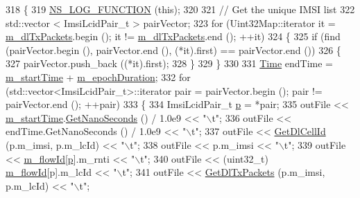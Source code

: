 \begin{DoxyCode}
318 \{
319   \hyperlink{log-macros-disabled_8h_a90b90d5bad1f39cb1b64923ea94c0761}{NS\_LOG\_FUNCTION} (\textcolor{keyword}{this});
320 
321   \textcolor{comment}{// Get the unique IMSI list}
322   std::vector < ImsiLcidPair\_t > pairVector;
323   \textcolor{keywordflow}{for} (Uint32Map::iterator it = \hyperlink{classns3_1_1RadioBearerStatsCalculator_aea685741eb32f0f501496176deb32ccb}{m\_dlTxPackets}.begin (); it != 
      \hyperlink{classns3_1_1RadioBearerStatsCalculator_aea685741eb32f0f501496176deb32ccb}{m\_dlTxPackets}.end (); ++it)
324     \{
325       \textcolor{keywordflow}{if} (find (pairVector.begin (), pairVector.end (), (*it).first) == pairVector.end ())
326         \{
327           pairVector.push\_back ((*it).first);
328         \}
329     \}
330 
331   \hyperlink{namespacens3_1_1TracedValueCallback_a7ffd3e7c142ffe7c8a1d2db9b8de38ec}{Time} endTime = \hyperlink{classns3_1_1RadioBearerStatsCalculator_a421041c2860801f4b5f9aa55869755c6}{m\_startTime} + \hyperlink{classns3_1_1RadioBearerStatsCalculator_ac510d632d9e9bafa59a07df7674ba7de}{m\_epochDuration};
332   \textcolor{keywordflow}{for} (std::vector<ImsiLcidPair\_t>::iterator pair = pairVector.begin (); pair != pairVector.end (); ++pair)
333     \{
334       ImsiLcidPair\_t \hyperlink{lte__link__budget_8m_ac9de518908a968428863f829398a4e62}{p} = *pair;
335       outFile << \hyperlink{classns3_1_1RadioBearerStatsCalculator_a421041c2860801f4b5f9aa55869755c6}{m\_startTime}.\hyperlink{classns3_1_1Time_a2fdb7bf0e1f5cd93b6149cb37bbb7f08}{GetNanoSeconds} () / 1.0e9 << \textcolor{stringliteral}{"\(\backslash\)t"};
336       outFile << endTime.GetNanoSeconds () / 1.0e9 << \textcolor{stringliteral}{"\(\backslash\)t"};
337       outFile << \hyperlink{classns3_1_1RadioBearerStatsCalculator_ab568573342dc1edd7c960586d93670d7}{GetDlCellId} (p.m\_imsi, p.m\_lcId) << \textcolor{stringliteral}{"\(\backslash\)t"};
338       outFile << p.m\_imsi << \textcolor{stringliteral}{"\(\backslash\)t"};
339       outFile << \hyperlink{classns3_1_1RadioBearerStatsCalculator_aab26a340278a0dcfb541f2d98917c9a0}{m\_flowId}[\hyperlink{lte__link__budget_8m_ac9de518908a968428863f829398a4e62}{p}].m\_rnti << \textcolor{stringliteral}{"\(\backslash\)t"};
340       outFile << (uint32\_t) \hyperlink{classns3_1_1RadioBearerStatsCalculator_aab26a340278a0dcfb541f2d98917c9a0}{m\_flowId}[p].m\_lcId << \textcolor{stringliteral}{"\(\backslash\)t"};
341       outFile << \hyperlink{classns3_1_1RadioBearerStatsCalculator_a55f9b9c664e1389ad9edf704e385299c}{GetDlTxPackets} (p.m\_imsi, p.m\_lcId) << \textcolor{stringliteral}{"\(\backslash\)t"};

\end{DoxyCode}
